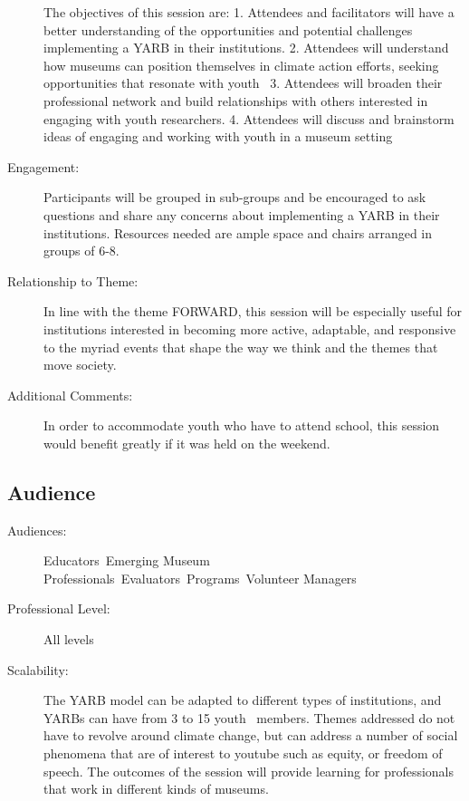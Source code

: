 \documentclass{report}
\begin{document}
\begin{description}
The objectives of this session are:
1. Attendees and facilitators will have a better understanding of the opportunities and potential challenges implementing a YARB in their institutions.
2. Attendees will understand how museums can position themselves in climate action efforts, seeking opportunities that resonate with youth 
3. Attendees will broaden their professional network and build relationships with others interested in engaging with youth researchers.
4. Attendees will discuss and brainstorm ideas of engaging and working with youth in a museum setting
							    \item [Engagement:]Participants will be grouped in sub-groups and be encouraged to ask questions and share any concerns about implementing a YARB in their institutions.
Resources needed are ample space and chairs arranged in groups of 6-8.
							    \item [Relationship to Theme:]In line with the theme FORWARD, this session will be especially useful for institutions interested in becoming more active, adaptable, and responsive to the myriad events that shape the way we think and the themes that move society.
							    
                    \item [Additional Comments: ]In order to accommodate youth who have to attend school, this session would benefit greatly if it was held on the weekend.

                \end{description}
              \subsection*{Audience}
                \begin{description}
                  \item [Audiences:]Educators~Emerging Museum Professionals~Evaluators~Programs~Volunteer Managers~
                  \item[Professional Level:]All levels~
                \item[Scalability:] The YARB model can be adapted to different types of institutions, and YARBs can have from 3 to 15 youth  members. Themes addressed do not have to revolve around climate change, but can address a number of social phenomena that are of interest to youtube such as equity, or freedom of speech. The outcomes of the session will provide learning for professionals that work in different kinds of museums.

							
              \end{description}
\end{document}
